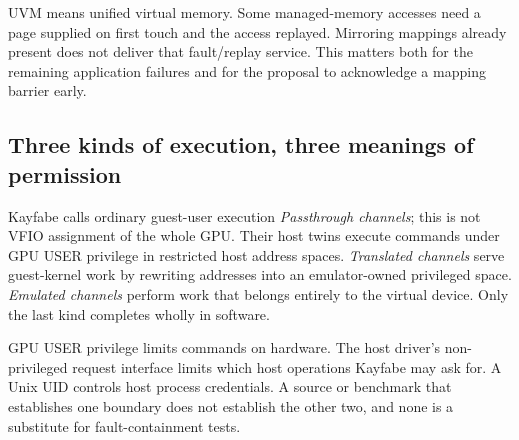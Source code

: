 \doc UVM means unified virtual memory. Some managed-memory accesses need a page supplied on
first touch and the access replayed. Mirroring mappings already present does not deliver that
fault/replay service. This matters both for the remaining application failures and for the
proposal to acknowledge a mapping barrier early.

\subsection{Three kinds of execution, three meanings of permission}

\doc Kayfabe calls ordinary guest-user execution \emph{Passthrough channels}; this is not VFIO
assignment of the whole GPU. Their host twins execute commands under GPU USER privilege in
restricted host address spaces. \emph{Translated channels} serve guest-kernel work by rewriting
addresses into an emulator-owned privileged space. \emph{Emulated channels} perform work that
belongs entirely to the virtual device. Only the last kind completes wholly in software.

GPU USER privilege limits commands on hardware. The host driver's non-privileged request
interface limits which host operations Kayfabe may ask for. A Unix UID controls host process
credentials. A source or benchmark that establishes one boundary does not establish the other
two, and none is a substitute for fault-containment tests.

